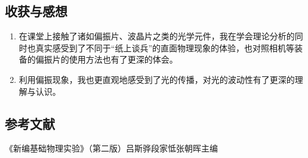 \documentclass[12pt,a4paper,UTF8]{ctexart}
\begin{document}
\subsection*{收获与感想}

	
	\begin{enumerate}[(1)]
			\item 在课堂上接触了诸如偏振片、波晶片之类的光学元件，我在学会理论分析的同时也真实感受到了不同于“纸上谈兵”的直面物理现象的体验，也对照相机等装备的偏振片的使用方法也有了更深的体会。
			\item 利用偏振现象，我也更直观地感受到了光的传播，对光的波动性有了更深的理解与认识。
	\end{enumerate}

\subsection*{参考文献}

《新编基础物理实验》（第二版）\qquad 吕斯骅\quad 段家怟\quad 张朝晖\quad 主编
	


\newpage %
\end{document}
